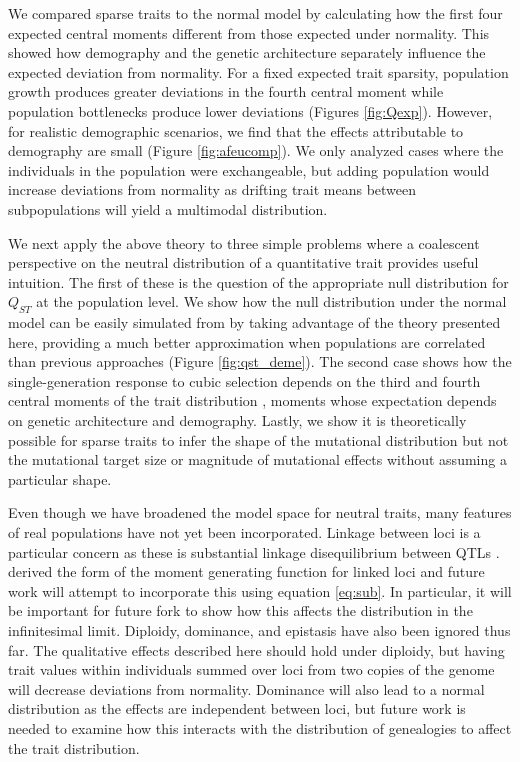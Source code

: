 We compared sparse traits to the normal model by calculating how the first four
expected central moments different from those expected under normality. This
showed how demography and the genetic architecture separately influence the
expected deviation from normality. For a fixed expected trait sparsity,
population growth produces greater deviations in the fourth central moment while
population bottlenecks produce lower deviations (Figures
\ref{fig:Qexp}). However, for realistic demographic scenarios,
we find that the effects attributable to demography are small (Figure
\ref{fig:afeucomp}). We only analyzed cases where the individuals in the
population were exchangeable, but adding population would increase deviations
from normality as drifting trait means between subpopulations will yield a
multimodal distribution.

We next apply the above theory to three simple problems where a coalescent
perspective on the neutral distribution of a quantitative trait provides useful
intuition. The first of these is the question of the appropriate null
distribution for $Q_{ST}$ at the population level. We show how the null
distribution under the normal model can be easily simulated from by taking
advantage of the theory presented here, providing a much better approximation
when populations are correlated than previous approaches \citep{Whitlock2009}
(Figure \ref{fig:qst_deme}). The second case shows how the single-generation
response to cubic selection depends on the third and fourth central moments of
the trait distribution \citep{Turelli1990}, moments whose expectation depends on
genetic architecture and demography. Lastly, we show it is theoretically
possible for sparse traits to infer the shape of the mutational distribution but
not the mutational target size or magnitude of mutational effects without
assuming a particular shape.

Even though we have broadened the model space for neutral traits, many features
of real populations have not yet been incorporated. Linkage between loci is a
particular concern as these is substantial linkage disequilibrium between QTLs
\citep{Bulik-Sullivan2015}. \citet{Lohse2011} derived the form of the moment
generating function for linked loci and future work will attempt to incorporate
this using equation \eqref{eq:sub}. In particular, it will be important for
future fork to show how this affects the distribution in the infinitesimal
limit. Diploidy, dominance, and epistasis have also been ignored thus far. The
qualitative effects described here should hold under diploidy, but having trait
values within individuals summed over loci from two copies of the genome will
decrease deviations from normality. Dominance will also lead to a normal
distribution as the effects are independent between loci, but future work is
needed to examine how this interacts with the distribution of genealogies to
affect the trait distribution.

